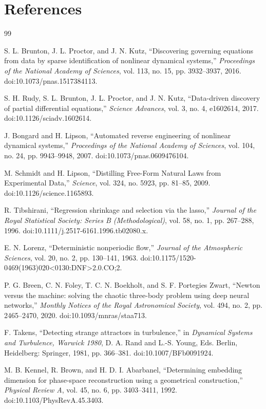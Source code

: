 \documentclass[11pt]{article}
\begin{document}
\section*{References}
\begin{thebibliography}{99}

S. L. Brunton, J. L. Proctor, and J. N. Kutz, ``Discovering governing equations from data by sparse identification of nonlinear dynamical systems,'' \emph{Proceedings of the National Academy of Sciences}, vol. 113, no. 15, pp. 3932--3937, 2016. doi:10.1073/pnas.1517384113.

S. H. Rudy, S. L. Brunton, J. L. Proctor, and J. N. Kutz, ``Data-driven discovery of partial differential equations,'' \emph{Science Advances}, vol. 3, no. 4, e1602614, 2017. doi:10.1126/sciadv.1602614.

J. Bongard and H. Lipson, ``Automated reverse engineering of nonlinear dynamical systems,'' \emph{Proceedings of the National Academy of Sciences}, vol. 104, no. 24, pp. 9943--9948, 2007. doi:10.1073/pnas.0609476104.

M. Schmidt and H. Lipson, ``Distilling Free-Form Natural Laws from Experimental Data,'' \emph{Science}, vol. 324, no. 5923, pp. 81--85, 2009. doi:10.1126/science.1165893.

R. Tibshirani, ``Regression shrinkage and selection via the lasso,'' \emph{Journal of the Royal Statistical Society: Series B (Methodological)}, vol. 58, no. 1, pp. 267--288, 1996. doi:10.1111/j.2517-6161.1996.tb02080.x.

E. N. Lorenz, ``Deterministic nonperiodic flow,'' \emph{Journal of the Atmospheric Sciences}, vol. 20, no. 2, pp. 130--141, 1963. doi:10.1175/1520-0469(1963)020<0130:DNF>2.0.CO;2.

P. G. Breen, C. N. Foley, T. C. N. Boekholt, and S. F. Portegies Zwart, ``Newton versus the machine: solving the chaotic three-body problem using deep neural networks,'' \emph{Monthly Notices of the Royal Astronomical Society}, vol. 494, no. 2, pp. 2465--2470, 2020. doi:10.1093/mnras/staa713.

F. Takens, ``Detecting strange attractors in turbulence,'' in \emph{Dynamical Systems and Turbulence, Warwick 1980}, D. A. Rand and L.-S. Young, Eds. Berlin, Heidelberg: Springer, 1981, pp. 366--381. doi:10.1007/BFb0091924.

M. B. Kennel, R. Brown, and H. D. I. Abarbanel, ``Determining embedding dimension for phase-space reconstruction using a geometrical construction,'' \emph{Physical Review A}, vol. 45, no. 6, pp. 3403--3411, 1992. doi:10.1103/PhysRevA.45.3403.


\end{thebibliography}
\end{document}
